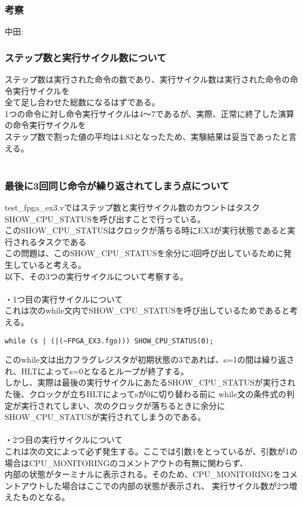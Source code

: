 \documentclass{jsarticle}
\begin{document}
\subsubsection*{考察}
中田: \\

\subsubsection*{ステップ数と実行サイクル数について}
ステップ数は実行された命令の数であり、実行サイクル数は実行された命令の命令実行サイクルを \\
全て足し合わせた総数になるはずである。 \\
1つの命令に対し命令実行サイクルは4～7であるが、実際、正常に終了した演算の命令実行サイクルを \\
ステップ数で割った値の平均は4.83となったため、実験結果は妥当であったと言える。 \\
\\
\subsubsection*{最後に3回同じ命令が繰り返されてしまう点について}
test\_fpga\_ex3.vではステップ数と実行サイクル数のカウントはタスクSHOW\_CPU\_STATUSを呼び出すことで行っている。 \\
このSHOW\_CPU\_STATUSはクロックが落ちる時にEX3が実行状態であると実行されるタスクである \\
この問題は、このSHOW\_CPU\_STATUSを余分に3回呼び出しているために発生していると考える。 \\
以下、その3つの実行サイクルについて考察する。 \\
\\
・1つ目の実行サイクルについて \\
これは次のwhile文内でSHOW\_CPU\_STATUSを呼び出しているためであると考える。 \\

\begin{lstlisting}[caption=test\_fpga\_ex3.v 264行目]
while (s | (|(~FPGA_EX3.fgo))) SHOW_CPU_STATUS(0);
\end{lstlisting}

このwhile文は出力フラグレジスタが初期状態の3であれば、s=1の間は繰り返され、HLTによってs=0となるとループが終了する。 \\
しかし、実際は最後の実行サイクルにあたるSHOW\_CPU\_STATUSが実行された後、クロックが立ちHLTによってsが0に切り替わる前に
while文の条件式の判定が実行されてしまい、次のクロックが落ちるときに余分にSHOW\_CPU\_STATUSが実行されてしまうのである。 \\
\\
・2つ目の実行サイクルについて \\
これは次の文によって必ず発生する。ここでは引数1をとっているが、引数が1の場合はCPU\_MONITORINGのコメントアウトの有無に関わらず、 \\
内部の状態がターミナルに表示される。そのため、CPU\_MONITORINGをコメントアウトした場合はここでの内部の状態が表示され、
実行サイクル数が2つ増えたものとなる。
\end{document}
